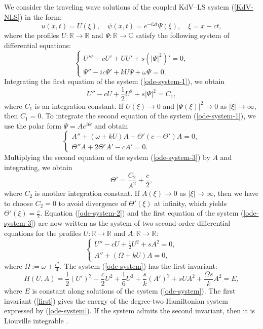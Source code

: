 \documentclass[12pt,reqno]{amsart}
\numberwithin{equation}{section}
\begin{document}
We consider the traveling wave solutions of the coupled KdV--LS system (\ref{KdV-NLS}) in the form:
\begin{equation}
    \label{TW}
u(x,t) = U(\xi), \quad \psi(x,t) =  e^{-i\omega t} \Psi(\xi), \quad \xi = x-ct,
\end{equation}
where the profiles $U : \mathbb{R} \to \mathbb{R}$ and $\Psi : \mathbb{R} \to \mathbb{C}$ satisfy the 
following system of differential equations:
\begin{equation}
    \label{ode-system-1}
    \begin{cases}
U''' - cU' + U U' + s (\vert \Psi\vert^2)'=0, \\
\Psi'' - ic \Psi' + k U \Psi +\omega \Psi=0.
\end{cases}
\end{equation}
Integrating the first equation of the system (\ref{ode-system-1}), we obtain 
\begin{equation}
    \label{ode-system-2}
U'' - c U + \frac{1}{2} U^2 + s \vert \Psi\vert^2 = C_1,
\end{equation}
where $C_1$ is an integration constant. If $U(\xi) \to 0$ and $|\Psi(\xi)|^2 \to 0$ as $|\xi| \to \infty$, then $C_1 = 0$. To integrate the second equation of the system (\ref{ode-system-1}), we use the 
polar form $\Psi = A e^{i\Theta}$ and obtain 
\begin{equation}
    \label{ode-system-3}
\begin{cases}
A'' + (\omega + kU) A + \Theta' (c - \Theta') A = 0, \\ 
\Theta'' A + 2 \Theta' A' - c A' =0. 
\end{cases}
\end{equation}
Multiplying the second equation of the system (\ref{ode-system-3}) by $A$ and integrating, we obtain 
\[
\Theta' = \frac{C_2}{A^2} + \frac{c}{2},
\]
where $C_2$ is another integration constant. If $A(\xi) \to 0$ as $|\xi| \to \infty$, then we have to choose 
$C_2 = 0$ to avoid divergence of $\Theta'(\xi)$ at infinity, which yields $\Theta'(\xi) =\frac{c}{2}$. 
Equation (\ref{ode-system-2}) and the first equation of the system (\ref{ode-system-3}) are now written 
as the system of two second-order differential equations for the profiles $U : \mathbb{R} \to \mathbb{R}$ and $A : \mathbb{R} \to \mathbb{R}$:
\begin{equation}
    \label{ode-system}
\begin{cases} 
U'' - c U + \frac{1}{2} U^2 + s A^2=0, \\ 
A'' + \left( \Omega + k U \right) A=0,
\end{cases}
\end{equation}
where $\Omega := \omega  +\frac{c^2}{4}$. The system (\ref{ode-system}) has the first invariant:
\begin{equation}
\label{first}
H(U,A) =  \frac{1}{2} (U')^2 - \frac{c}{2} U^2 + \frac{1}{6} U^3 + \frac{s}{k} (A')^2 + s U A^2 + \frac{\Omega s}{k}  A^2 = E,
\end{equation}
where $E$ is constant along solutions of the system (\ref{ode-system}). 
The first invariant (\ref{first}) gives the energy of the degree-two Hamiltonian system expressed by (\ref{ode-system}). 
If the system admits the second invariant, then it is Liouville integrable \cite{Hietarinta}. 
\end{document}
